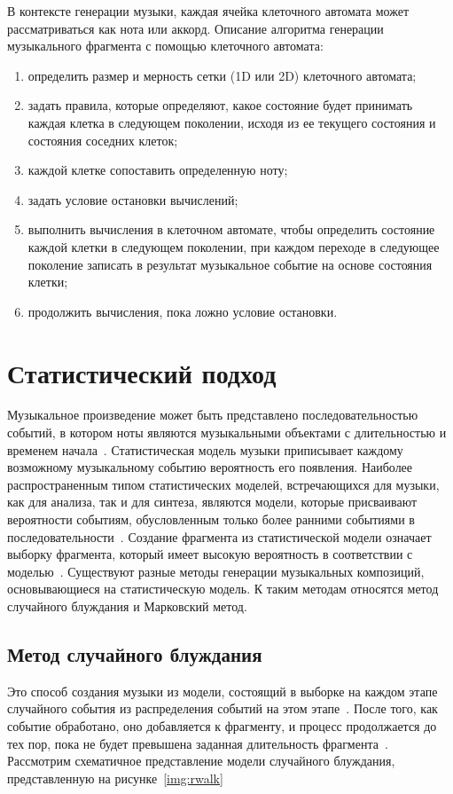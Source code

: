 В контексте генерации музыки, каждая ячейка клеточного автомата может рассматриваться как нота или аккорд. 
Описание алгоритма генерации музыкального фрагмента с помощью клеточного автомата:
\begin{enumerate}
	\item определить размер и мерность сетки (1D или 2D) клеточного автомата;
	\item задать правила, которые определяют, какое состояние будет принимать каждая клетка в следующем поколении, исходя из ее текущего состояния и состояния соседних клеток;
	\item каждой клетке сопоставить определенную ноту;
	\item задать условие остановки вычислений;
	\item выполнить вычисления в клеточном автомате, чтобы определить состояние каждой клетки в следующем поколении, при каждом переходе в следующее поколение записать в результат музыкальное событие на основе состояния клетки;
	\item продолжить вычисления, пока ложно условие остановки.
\end{enumerate}

\section{Статистический подход}

Музыкальное произведение может быть представлено последовательностью событий, в котором ноты являются музыкальными объектами с длительностью и временем начала~\cite{statistic}. Статистическая модель музыки приписывает каждому возможному музыкальному событию вероятность его появления. Наиболее распространенным типом статистических моделей, встречающихся для музыки, как для анализа, так и для синтеза, являются модели, которые присваивают вероятности событиям, обусловленным только более ранними событиями в последовательности~\cite{statistic}. Создание фрагмента из статистической модели означает выборку фрагмента, который имеет высокую вероятность в соответствии с моделью~\cite{statistic}. Существуют разные методы генерации музыкальных композиций, основывающиеся на статистическую модель. К таким методам относятся метод случайного блуждания и Марковский метод.


\subsection{Метод случайного блуждания}
Это способ создания музыки из модели, состоящий в выборке на каждом этапе случайного события из распределения событий на этом этапе~\cite{statistic}. После того, как событие обработано, оно добавляется к фрагменту, и процесс продолжается до тех пор, пока не будет превышена заданная длительность фрагмента~\cite{rwalk}. Рассмотрим схематичное представление модели случайного блуждания, представленную на рисунке~\ref{img:rwalk}


